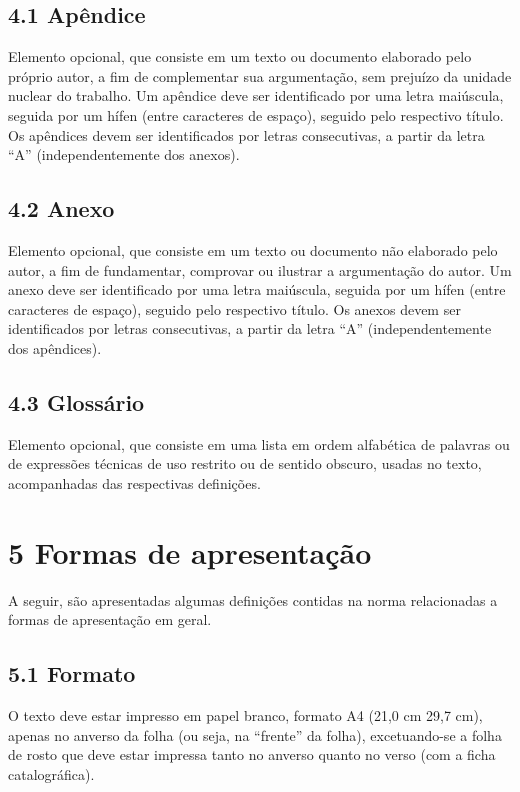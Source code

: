 \documentclass[
	12pt,				%
	oneside,			%
	a4paper,			%
	english,			%
	brazil				%
	]{abntex2ppgsi}
\begin{document}
\begin{anexosenv}
\subsection*{4.1 Apêndice}

Elemento opcional, que consiste em um texto ou documento elaborado pelo próprio autor, a fim de complementar sua argumentação, sem prejuízo da unidade nuclear do trabalho. Um apêndice deve ser identificado por uma letra maiúscula, seguida por um hífen (entre caracteres de espaço), seguido pelo respectivo título. Os apêndices devem ser identificados por letras consecutivas, a partir da letra ``A'' (independentemente dos anexos).

\subsection*{4.2 Anexo}

Elemento opcional, que consiste em um texto ou documento não elaborado pelo autor, a fim de fundamentar, comprovar ou ilustrar a argumentação do autor. Um anexo deve ser identificado por uma letra maiúscula, seguida por um hífen (entre caracteres de espaço), seguido pelo respectivo título. Os anexos devem ser identificados por letras consecutivas, a partir da letra ``A'' (independentemente dos apêndices).

\subsection*{4.3 Glossário}

Elemento opcional, que consiste em uma lista em ordem alfabética de palavras ou de expressões técnicas de uso restrito ou de sentido obscuro, usadas no texto, acompanhadas das respectivas definições.

\section*{5 Formas de apresentação}

A seguir, são apresentadas algumas definições contidas na norma relacionadas a formas de apresentação em geral.

\subsection*{5.1 Formato}

O texto deve estar impresso em papel branco, formato A4 (21,0 cm 29,7 cm), apenas no anverso da folha (ou seja, na ``frente'' da folha), excetuando-se a folha de rosto que deve estar impressa tanto no anverso quanto no verso (com a ficha catalográfica).


\end{anexosenv}
\end{document}
